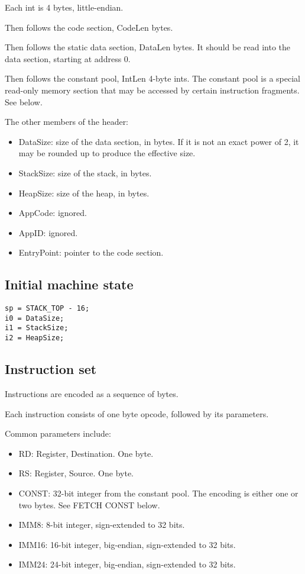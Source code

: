 \documentclass {article}
\begin{document}
Each int is 4 bytes, little-endian.

Then follows the code section, CodeLen bytes.

Then follows the static data section, DataLen bytes.
It should be read into the data section, starting at address 0.

Then follows the constant pool, IntLen 4-byte ints.
The constant pool is a special read-only memory section that may be accessed by
certain instruction fragments. See below.

The other members of the header:
\begin{itemize}
	\item DataSize: size of the data section, in bytes. If it is not an exact power of 2, it may be rounded up to produce the effective size.
	\item StackSize: size of the stack, in bytes.
	\item HeapSize: size of the heap, in bytes.
	\item AppCode: ignored.
	\item	AppID: ignored.
	\item EntryPoint: pointer to the code section.
\end{itemize}


\subsection{Initial machine state}

\begin{verbatim}
sp = STACK_TOP - 16;
i0 = DataSize;
i1 = StackSize;
i2 = HeapSize;
\end{verbatim}


\subsection{Instruction set}

Instructions are encoded as a sequence of bytes.

Each instruction consists of one byte opcode, followed by its parameters.

Common parameters include:
\begin{itemize}
	\item RD: Register, Destination. One byte.
	\item RS: Register, Source. One byte.
	\item CONST: 32-bit integer from the constant pool. The encoding is either one or two bytes. See FETCH CONST below.
	\item IMM8: 8-bit integer, sign-extended to 32 bits.
	\item IMM16: 16-bit integer, big-endian, sign-extended to 32 bits.
	\item IMM24: 24-bit integer, big-endian, sign-extended to 32 bits.
\end{itemize}
\end{document}
